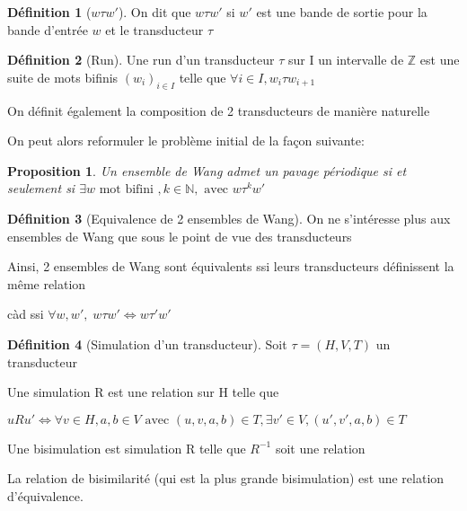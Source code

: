 \documentclass{scrartcl}
\newcommand{\N}{\mathbb N}
\newcommand{\Z}{\mathbb Z}
\newtheorem{proposition}{Proposition}
\theoremstyle{definition}
\newtheorem{definition}{Définition}
\theoremstyle{remark}
\begin{document}
\begin{definition}[$w \tau w'$]
    
On dit que $w \tau w'$ si $w'$ est une bande de sortie pour la bande d'entrée $w$ et le transducteur $\tau$


\end{definition}

\begin{definition}[Run]
    
Une run d'un transducteur $\tau$ sur I un intervalle de $\Z$ est une suite de mots bifinis ${(w_i)}_{i \in I}$
telle que $\forall i \in I, w_i \tau w_{i+1}$

\end{definition}

On définit également la composition de 2 transducteurs de manière naturelle

On peut alors reformuler le problème initial de la façon suivante:

\begin{proposition}
    
Un ensemble de Wang admet un pavage périodique si et seulement si $\exists w \text{ mot bifini }, k \in \N, \text{ avec } w \tau^k w'$

\end{proposition}

\begin{definition}[Equivalence de 2 ensembles de Wang]
    
On ne s'intéresse plus aux ensembles de Wang que sous le point de vue des transducteurs

Ainsi, 2 ensembles de Wang sont équivalents ssi leurs transducteurs définissent la même relation

càd ssi $\forall w,w', \; w \tau w' \iff w \tau' w'$


\end{definition}

\begin{definition}[Simulation d'un transducteur]

Soit $\tau = (H,V,T)$ un transducteur

Une simulation R est une relation sur H telle que 
    
$uRu' \iff \forall v \in H, a,b \in V \text{ avec } (u,v,a,b) \in T, \exists v' \in V, (u',v',a,b) \in T$

Une bisimulation est simulation R telle que $R^{-1}$ soit une relation

La relation de bisimilarité (qui est la plus grande bisimulation) est une relation d'équivalence.

\end{definition}
\end{document}
